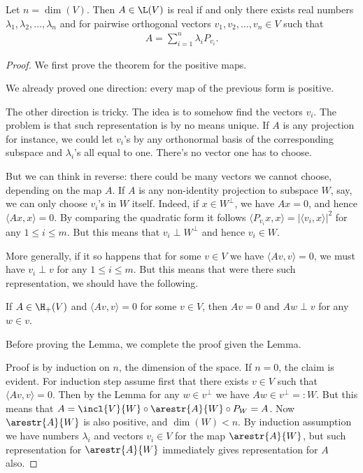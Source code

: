 \begin{lause}\label{cheapSpectral}
	Let $n = \dim(V)$. Then $A \in \L(V)$ is real if and only there exists real numbers $\lambda_{1}, \lambda_{2}, \ldots, \lambda_{n}$ and for pairwise orthogonal vectors $v_{1}, v_{2}, \ldots, v_{n} \in V$ such that
	\begin{align}\label{spectralrepr}
		A = \sum_{i = 1}^{n} \lambda_{i} P_{v_{i}}.
	\end{align}
\end{lause}
\begin{proof}
	We first prove the theorem for the positive maps.

	We already proved one direction: every map of the previous form is positive.

	The other direction is tricky. The idea is to somehow find the vectors $v_{i}$. The problem is that such representation is by no means unique. If $A$ is any projection for instance, we could let $v_{i}$'s by any orthonormal basis of the corresponding subspace and $\lambda_{i}$'s all equal to one. There's no vector one has to choose.

	But we can think in reverse: there could be many vectors we cannot choose, depending on the map $A$. If $A$ is any non-identity projection to subspace $W$, say, we can only choose $v_{i}$'s in $W$ itself. Indeed, if $x \in W^{\perp}$, we have $A x = 0$, and hence $\langle A x, x \rangle = 0$. By comparing the quadratic form it follows $\langle P_{v_{i}} x, x \rangle = |\langle v_{i}, x \rangle|^{2}$ for any $1 \leq i \leq m$. But this means that $v_{i} \perp W^{\perp}$ and hence $v_{i} \in W$.

	More generally, if it so happens that for some $v \in V$ we have $\langle A v, v \rangle = 0$, we must have $v_{i} \perp v$ for any $1 \leq i \leq m$. But this means that were there such representation, we should have the following.

	\begin{lem}\label{spectralZeroLemma}
		If $A \in \H_{+}(V)$ and $\langle A v, v \rangle = 0$ for some $v \in V$, then $A v = 0$ and $A w \perp v$ for any $w \in v$.
	\end{lem}

	Before proving the Lemma, we complete the proof given the Lemma.

	Proof is by induction on $n$, the dimension of the space. If $n = 0$, the claim is evident. For induction step assume first that there exists $v \in V$ such that $\langle A v, v \rangle = 0$. Then by the Lemma for any $w \in v^{\perp}$ we have $A w \in v^{\perp} =: W$. But this means that $A = \incl{V}{W} \circ \arestr{A}{W} \circ P_{W} = A$. Now $\arestr{A}{W}$ is also positive, and $\dim(W) < n$. By induction assumption we have numbers $\lambda_{i}$ and vectors $v_{i} \in V$ for the map $\arestr{A}{W}$, but such representation for $\arestr{A}{W}$ immediately gives representation for $A$ also.


\end{proof}
